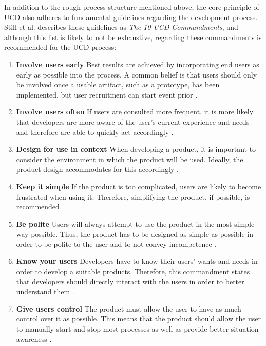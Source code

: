 \documentclass[draft,final]{vutinfth} %
\begin{document}
In addition to the rough process structure mentioned above, the core principle of UCD also adheres to fundamental guidelines regarding the development process. Still et al. \cite{still2017fundamentals} describes these guidelines as \emph{The 10 UCD Commandments}, and although this list is likely to not be exhaustive, regarding these commandments is recommended for the UCD process:
\begin{enumerate}
\item \textbf{Involve users early} Best results are achieved by incorporating end users as early as possible into the process. A common belief is that users should only be involved once a usable artifact, such as a prototype, has been implemented, but user recruitment can start event prior \cite{still2017fundamentals}.
\item \textbf{Involve users often} If users are consulted more frequent, it is more likely that developers are more aware of the user's current experience and needs and therefore are able to quickly act accordingly \cite{garrett2022elements}.
\item \textbf{Design for use in context} When developing a product,  it is important to consider the environment in which the product will be used. Ideally, the product design accommodates for this accordingly \cite{still2017fundamentals}.
\item \textbf{Keep it simple} If the product is too complicated, users are likely to become frustrated when using it. Therefore, simplifying the product, if possible, is recommended \cite{colborne2017simple}.
\item \textbf{Be polite} Users will always attempt to use the product in the most simple way possible. Thus, the product has to be designed as simple as possible in order to be polite to the user and to not convey incompetence \cite{cooper199914}.
\item \textbf{Know your users} Developers have to know their users' wants and needs in order to develop a suitable products. Therefore, this commandment states that developers should directly interact with the users in order to better understand them \cite{still2017fundamentals}.
\item \textbf{Give users control} The product must allow the user to have as much control over it as possible. This means that the product should allow the user to manually start and stop most processes as well as provide better situation awareness \cite{jones2004designer}.


\end{enumerate}
\end{document}
